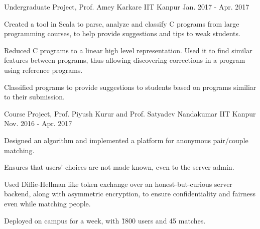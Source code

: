 


\begin{cventries}

  \cventry
  {Undergraduate Project, Prof. Amey Karkare}
  {{}
    {}}
  {IIT Kanpur}
  {Jan. 2017 - Apr. 2017}
  {
    \begin{cvitems}
    \item Created a tool in Scala to parse, analyze and classify C programs from large programming courses, to help provide suggestions and tips to weak students.
    \item Reduced C programs to a linear high level representation. Used it to find similar features between programs, thus allowing discovering corrections in a program using reference programs.
    \item Classified programs to provide suggestions to students based on programs similiar to their submission.
    \end{cvitems}
    \vspace{-5mm}
  }

  \cventry
  {Course Project, Prof. Piyush Kurur and
    Prof. Satyadev Nandakumar}
  {\href{https://github.com/pclubiitk/puppy-love}{}}
  {IIT Kanpur}
  {Nov. 2016 - Apr. 2017}
  {
    \begin{cvitems}
      \item Designed an algorithm and implemented a platform
        for anonymous pair/couple matching.
      \item Ensures that users' choices are not made known, even to the
        server admin.
      \item Used Diffie-Hellman like token exchange over an
        honest-but-curious server backend, along with asymmetric encryption, to
        ensure confidentiality and fairness even while matching people.
      \item Deployed on campus for a week, with \~1800 users and 45 matches.
    \end{cvitems}
  }



\end{cventries}

